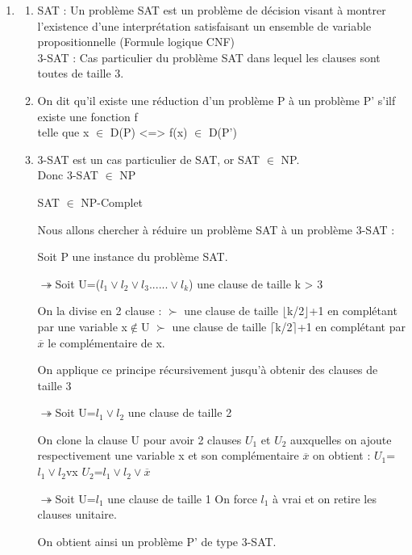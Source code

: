 \documentclass[]{article}
\begin{document}
\begin{enumerate}
\item 
  \begin{enumerate}
  \item
    SAT : Un  problème SAT est un problème de décision visant à montrer l'existence d'une interprétation satisfaisant un ensemble de variable propositionnelle (Formule logique CNF)\\
    3-SAT : Cas particulier du problème SAT dans lequel les clauses sont toutes de taille 3.\\

  \item
    On dit qu'il existe une réduction d'un problème P à un problème P' s'ilf existe une fonction f\\
    telle que x $\in$ D(P) <=> f(x) $\in$ D(P')\\

  \item
    3-SAT est un cas particulier de SAT, or SAT $\in$ NP.\\
    Donc 3-SAT $\in$ NP

    SAT $\in$ NP-Complet

    Nous allons chercher à réduire un problème SAT à un problème 3-SAT : 

    Soit P une instance du problème SAT.
    
    $\twoheadrightarrow$Soit U=($l_1 \vee l_2 \vee l_3......\vee l_k$) une clause de taille k > 3

    On la divise en 2 clause :
    $\succ$ une clause de taille $\lfloor$k/2$\rfloor$+1 en complétant par une variable x$\notin$U 
    $\succ$ une clause de taille $\lceil$k/2$\rceil$+1 en complétant par $\overline x$ le complémentaire de x.

    On applique ce principe récursivement jusqu'à obtenir des clauses de taille 3

    $\twoheadrightarrow$Soit U={$l_1 \vee l_2$} une clause de taille 2
    
    On clone la clause U pour avoir 2 clauses $U_1$ et $U_2$ auxquelles on ajoute respectivement une variable x et son complémentaire $\overline x$
    on obtient :  $U_1$={$l_1 \vee l_2$vx}
    $U_2$={$l_1 \vee l_2 \vee \overline x$}

    $\twoheadrightarrow$Soit U={$l_1$} une clause de taille 1
    On force $l_1$ à vrai et on retire les clauses unitaire.

    On obtient ainsi un problème P' de type 3-SAT.    


\end{enumerate}
\end{enumerate}
\end{document}
